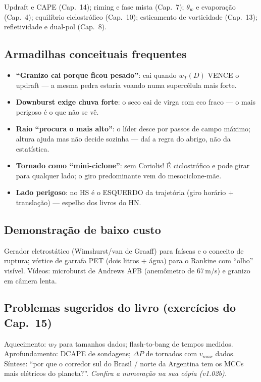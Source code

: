 Updraft e CAPE (Cap.~14); riming e fase mista (Cap.~7); $\theta_w$ e
evaporação (Cap.~4); equilíbrio ciclostrófico (Cap.~10); esticamento
de vorticidade (Cap.~13); refletividade e dual-pol (Cap.~8).

\subsection*{Armadilhas conceituais frequentes}

\begin{itemize}
  \item \textbf{``Granizo cai porque ficou pesado''}: cai quando
        $w_T(D)$ VENCE o updraft — a mesma pedra estaria voando numa
        supercélula mais forte.
  \item \textbf{Downburst exige chuva forte}: o seco cai de virga com
        eco fraco — o mais perigoso é o que não se vê.
  \item \textbf{Raio ``procura o mais alto''}: o líder desce por
        passos de campo máximo; altura ajuda mas não decide sozinha —
        daí a regra do abrigo, não da estatística.
  \item \textbf{Tornado como ``mini-ciclone''}: sem Coriolis! É
        ciclostrófico e pode girar para qualquer lado; o giro
        predominante vem do mesociclone-mãe.
  \item \textbf{Lado perigoso}: no HS é o ESQUERDO da trajetória
        (giro horário $+$ translação) — espelho dos livros do HN.
\end{itemize}

\subsection*{Demonstração de baixo custo}

Gerador eletrostático (Wimshurst/van de Graaff) para faíscas e o
conceito de ruptura; vórtice de garrafa PET (dois litros + água) para
o Rankine com ``olho'' visível. Vídeos: microburst de Andrews AFB
(anemômetro de 67\,m/s) e granizo em câmera lenta.

\subsection*{Problemas sugeridos do livro (exercícios do Cap.~15)}

Aquecimento: $w_T$ para tamanhos dados; flash-to-bang de tempos
medidos. Aprofundamento: DCAPE de sondagens; $\Delta P$ de tornados
com $v_{max}$ dados. Síntese: ``por que o corredor sul do Brasil /
norte da Argentina tem os MCCs mais elétricos do planeta?''.
\emph{Confira a numeração na sua cópia (v1.02b).}


